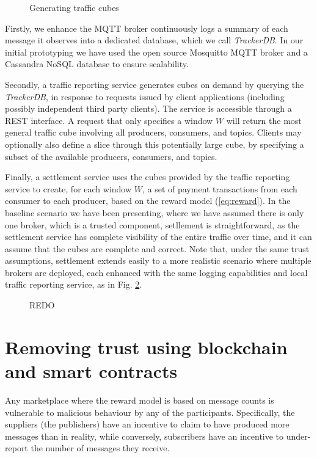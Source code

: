 \documentclass[conference]{IEEEtran}
\begin{document}
\begin{figure}
	\caption{Generating traffic cubes}
	\label{fig:cubes}
\end{figure}

Firstly, we enhance the MQTT broker continuously logs a summary of each message it observes into a dedicated database, which we call \textit{TrackerDB}.  In our initial prototyping we have used the open source Mosquitto MQTT broker and a Cassandra NoSQL database to ensure scalability. 

Secondly, a traffic reporting service generates cubes on demand by querying the \textit{TrackerDB}, in response to requests issued by client applications (including possibly independent third party clients). The service is accessible through a REST interface. A request that only specifies a window $ W $ will return the most general traffic cube involving all producers, consumers, and topics. Clients may optionally also define a slice through this potentially large cube, by specifying a subset of the available producers, consumers, and topics.

Finally, a settlement service uses the cubes provided by the traffic reporting service to create, for each window $ W $, a set of payment transactions from each consumer to each producer, based on the reward model (\ref{eq:reward}).
In the baseline scenario we have been presenting, where we have assumed there is only one broker, which is a trusted component, setllement is straightforward, as the settlement service has complete visibility of the entire traffic over time, and it can assume that the cubes are complete and correct.
Note that, under the same trust assumptions, settlement extends easily to a more realistic scenario where multiple brokers are deployed, each enhanced with the same logging capabilities and local traffic reporting service, as in Fig. \ref{fig:cubes-in-context}.

\begin{figure}
	\caption{REDO}
	\label{fig:cubes-in-context}
\end{figure}

\section{Removing trust using blockchain and smart contracts}

Any marketplace where the reward model is based on message counts is vulnerable to malicious behaviour by any of the participants. Specifically, the suppliers (the publishers) have an incentive to claim to have produced more messages than in reality, while conversely, subscribers have an incentive to under-report the number of messages they receive.
\end{document}

